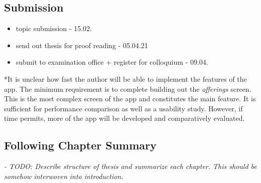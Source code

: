 \subsection{Submission}
\begin{itemize}
    \item topic submission - 15.02.
    \item send out thesis for proof reading - 05.04.21
    \item submit to examination office + register for colloquium - 09.04.
\end{itemize}

*It is unclear how fast the author will be able to implement the features of the app. 
The minimum requirement is to complete building out the \textit{offerings} screen. 
This is the most complex screen of the app and constitutes the main feature. 
It is sufficient for performance comparison as well as a usability study. 
However, if time permits, more of the app will be developed and comparatively evaluated. \\

\subsection{Following Chapter Summary}
\textit{- TODO: Describe structure of thesis and summarize each chapter. 
This should be somehow interwoven into introduction.}